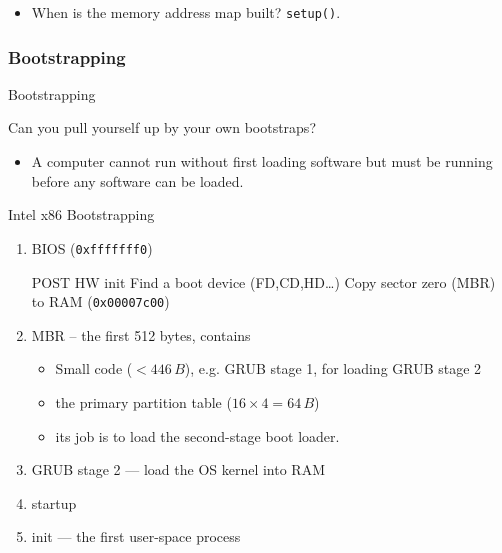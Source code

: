 \begin{itemize}
\item When is the memory address map built? \texttt{setup()}.
\end{itemize}

\subsubsection{Bootstrapping}
\label{sec:bootstrapping}

\begin{frame}{Bootstrapping}
  \begin{block}{Can you pull yourself up by your own bootstraps?}
    \begin{itemize}
    \item[] A computer cannot run without first loading software but must be running
      before any software can be loaded.
    \end{itemize}
  \end{block}
  \begin{center}
  \end{center}
\end{frame}

\begin{frame}{Intel x86 Bootstrapping}
  \begin{enumerate}
  \item BIOS (\texttt{0xfffffff0})\\
    \begin{small}
      {} POST\quad
      {} HW init\quad
      {} Find a boot device (FD,CD,HD\ldots{})\quad
      {} Copy \alert{sector zero (MBR)} to RAM (\texttt{0x00007c00})
    \end{small}
  \item MBR -- the first 512 bytes, contains
    \begin{itemize}
    \item Small code ($< 446\,B$), e.g. GRUB stage 1, for loading GRUB stage 2
    \item the primary partition table ($16\times{}4=64\,B$)
    \item its job is to load the second-stage boot loader.
    \end{itemize}
  \item GRUB stage 2 --- load the OS kernel into RAM
  \item {\linux} startup
  \item init --- the first user-space process
  \end{enumerate}
  \begin{center}
  \end{center}
  \qquad{}
\end{frame}

